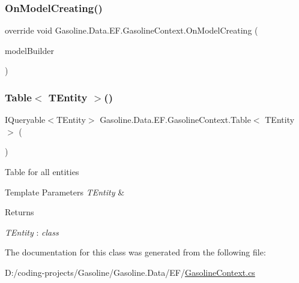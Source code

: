 \subsubsection{\texorpdfstring{OnModelCreating()}{OnModelCreating()}}
{\footnotesize\ttfamily override void Gasoline.\+Data.\+E\+F.\+Gasoline\+Context.\+On\+Model\+Creating (\begin{DoxyParamCaption}\item[{Model\+Builder}]{model\+Builder }\end{DoxyParamCaption})\hspace{0.3cm}{\ttfamily [protected]}}

\mbox{\label{class_gasoline_1_1_data_1_1_e_f_1_1_gasoline_context_af9496b967fdbccfb12a45dc5caff7d2f}} 
\subsubsection{\texorpdfstring{Table$<$ TEntity $>$()}{Table< TEntity >()}}
{\footnotesize\ttfamily I\+Queryable$<$T\+Entity$>$ Gasoline.\+Data.\+E\+F.\+Gasoline\+Context.\+Table$<$ T\+Entity $>$ (\begin{DoxyParamCaption}{ }\end{DoxyParamCaption})}



Table for all entities 


\begin{DoxyTemplParams}{Template Parameters}
{\em T\+Entity} & \\
\hline
\end{DoxyTemplParams}
\begin{DoxyReturn}{Returns}

\end{DoxyReturn}
\begin{Desc}
\item[Type Constraints]\begin{description}
\item[{\em T\+Entity} : {\em class}]\end{description}
\end{Desc}


The documentation for this class was generated from the following file\+:\begin{DoxyCompactItemize}
\item 
D\+:/coding-\/projects/\+Gasoline/\+Gasoline.\+Data/\+E\+F/\mbox{\hyperlink{_gasoline_context_8cs}{Gasoline\+Context.\+cs}}\end{DoxyCompactItemize}
